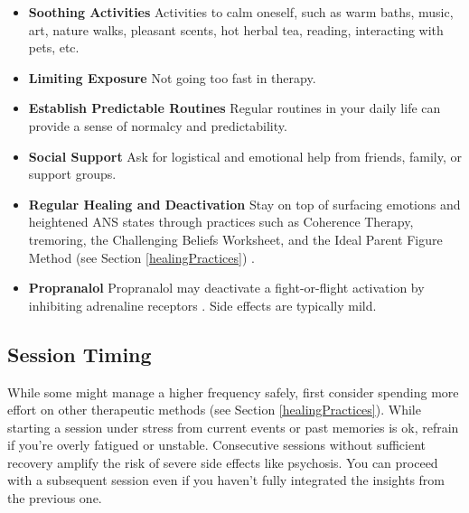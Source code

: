 \documentclass[12pt,letterpaper]{article}
\begin{document}
\begin{itemize}
    \item \textbf{Soothing Activities} Activities to calm oneself, such as warm baths, music, art, nature walks, pleasant scents, hot herbal tea, reading, interacting with pets, etc. 
    \item \textbf{Limiting Exposure} Not going too fast in therapy.  
    \item \textbf{Establish Predictable Routines} Regular routines in your daily life can provide a sense of normalcy and predictability. 
    \item \textbf{Social Support} Ask for logistical and emotional help from friends, family, or support groups.
    \item \textbf{Regular Healing and Deactivation} Stay on top of surfacing emotions and heightened ANS states through practices such as Coherence Therapy, tremoring, the Challenging Beliefs Worksheet, and the Ideal Parent Figure Method (see Section \ref{healingPractices}) \cite{brownAttachmentDisturbances}.
    \item \textbf{Propranalol} Propranalol may deactivate a fight-or-flight activation by inhibiting adrenaline receptors \cite{steenenPropranalol}. Side effects are typically mild. 
\end{itemize}
\subsection{Session Timing}
While some might manage a higher frequency safely, first consider spending more effort on other therapeutic methods (see Section \ref{healingPractices}).
While starting a session under stress from current events or past memories is ok, refrain if you're overly fatigued or unstable.   Consecutive sessions without sufficient recovery amplify the risk of severe side effects like psychosis. You can proceed with a subsequent session even if you haven't fully integrated the insights from the previous one.
\end{document}
